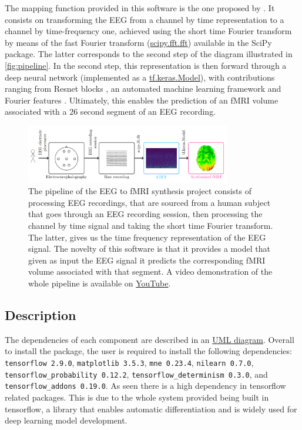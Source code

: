 The mapping function provided in this software is the one proposed by \citep{calhas2022eeg}. It consists on transforming the EEG from a channel by time representation to a channel by time-frequency one, achieved using the short time Fourier transform \citep{allen1977short} by means of the fast Fourier transform (\href{https://docs.scipy.org/doc/scipy/reference/generated/scipy.fft.fft.html}{scipy.fft.fft}) available in the SciPy package. The latter corresponds to the second step of the diagram illustrated in \autoref{fig:pipeline}. In the second step, this representation is then forward through a deep neural network (implemented as a \href{https://www.tensorflow.org/api_docs/python/tf/keras/Model}{tf.keras.Model}), with contributions ranging from Resnet blocks \citep{he2016deep}, an automated machine learning framework \citep{calhas2022automatic} and Fourier features \citep{tancik2020fourier}. Ultimately, this enables the prediction of an fMRI volume associated with a $26$ second segment of an EEG recording.

\begin{figure}[t]
    \centering
    \includegraphics[width=0.8\textwidth]{figures/diagram.png}
    \caption{The pipeline of the EEG to fMRI synthesis project consists of processing EEG recordings, that are sourced from a human subject that goes through an EEG recording session, then processing the channel by time signal and taking the short time Fourier transform. The latter, gives us the time frequency representation of the EEG signal. The novelty of this software is that it provides a model that given as input the EEG signal it predicts the corresponding fMRI volume associated with that segment. A video demonstration of the whole pipeline is available on \href{https://youtu.be/47uJbI0hU_I}{YouTube}.}
    \label{fig:pipeline}
\end{figure}

\subsection{Description}\label{section:description}

The dependencies of each component are described in an \href{https://github.com/eeg-to-fmri/eeg-to-fmri/blob/main/project_UML.pdf}{UML diagram}. Overall to install the package, the user is required to install the following dependencies: \texttt{tensorflow 2.9.0}, \texttt{matplotlib 3.5.3}, \texttt{mne 0.23.4}, \texttt{nilearn 0.7.0}, \texttt{tensorflow\_probability 0.12.2}, \texttt{tensorflow\_determinism 0.3.0}, and \texttt{tensorflow\_addons 0.19.0}. As seen there is a high dependency in tensorflow related packages. This is due to the whole system provided being built in tensorflow, a library that enables automatic differentiation and is widely used for deep learning model development.

